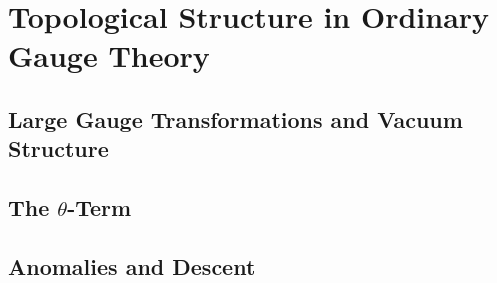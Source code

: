 %
%
%
%

\section{Topological Structure in Ordinary Gauge Theory}


\subsection{Large Gauge Transformations and Vacuum Structure}


\subsection{\texorpdfstring{The $\theta$-Term}{The theta-Term}}


\subsection{Anomalies and Descent}

